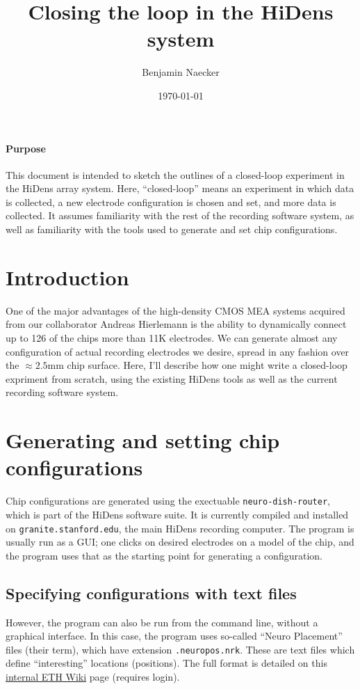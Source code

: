 \documentclass[12pt]{article}
\title{Closing the loop in the HiDens system}
\author{Benjamin Naecker}
\date{\today}
\begin{document}
\maketitle

\paragraph{Purpose} This document is intended to sketch the outlines of a
closed-loop experiment in the HiDens array system. Here, ``closed-loop'' means
an experiment in which data is collected, a new electrode configuration is
chosen and set, and more data is collected. It assumes familiarity with the
rest of the recording software system, as well as familiarity with the tools
used to generate and set chip configurations.

\section*{Introduction} One of the major advantages of the high-density
CMOS MEA systems acquired from our collaborator Andreas Hierlemann is the
ability to dynamically connect up to 126 of the chips more than 11K electrodes.
We can generate almost any configuration of actual recording electrodes we
desire, spread in any fashion over the $\approx 2.5$mm chip surface.
Here, I'll describe how one might write a closed-loop expriment from scratch,
using the existing HiDens tools as well as the current recording software system.

\section*{Generating and setting chip configurations}

Chip configurations are generated using the exectuable \texttt{neuro-dish-router},
which is part of the HiDens software suite. It is currently compiled and installed
on \texttt{granite.stanford.edu}, the main HiDens recording computer. The program
is usually run as a GUI; one clicks on desired electrodes on a model of the chip,
and the program uses that as the starting point for generating a configuration.

\subsection*{Specifying configurations with text files}

However, the program can also be run from the command line, without a graphical
interface. In this case, the program uses so-called ``Neuro Placement'' files
(their term), which have extension \texttt{.neuropos.nrk}. These are text files
which define ``interesting'' locations (positions). The full format is detailed
on this \href{https://wiki-bsse.ethz.ch/display/DBSSECMOSMEA/NeuroDishRouter#NeuroDishRouter-NeuroPlacementFile(*.neuropos.nrk)}{internal ETH Wiki} page (requires login).
\end{document}
